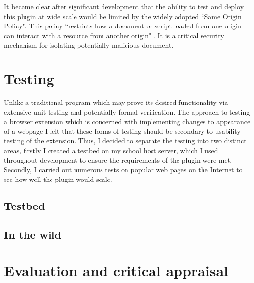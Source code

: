 \documentclass[12pt]{article}
\begin{document}
It became clear after significant development that the ability to test and deploy this plugin at wide scale would be limited by the widely adopted ``Same Origin Policy". This policy ``restricts how a document or script loaded from one origin can interact with a resource from another origin" \parencite{sameOrigin}. It is a critical security mechanism for isolating potentially malicious document.

\section{Testing}
Unlike a traditional program which may prove its desired functionality via extensive unit testing and potentially formal verification. The approach to testing a browser extension which is concerned with implementing changes to appearance of a webpage I felt that these forms of testing should be secondary to usability testing of the extension. Thus, I decided to separate the testing into two distinct areas, firstly I created a testbed on my school host server, which I used throughout development to ensure the requirements of the plugin were met. Secondly, I carried out numerous tests on popular web pages on the Internet to see how well the plugin would scale. 

\subsection{Testbed}

\subsection{In the wild}

\section{Evaluation and critical appraisal}
\end{document}
